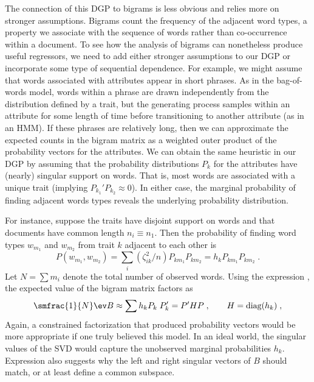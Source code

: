 \documentclass[12pt]{article}
\begin{document}
The connection of this DGP to bigrams is less obvious and relies more on stronger assumptions.  Bigrams count the frequency of the adjacent word types, a property we associate with the sequence of words rather than co-occurrence within a document.  To see how the analysis of bigrams can nonetheless produce useful regressors, we need to add either stronger assumptions to our DGP or incorporate some type of sequential dependence.  For example, we might assume that words associated with attributes appear in short phrases.   As in the bag-of-words model, words within a phrase are drawn independently from the distribution defined by a trait, but the generating process samples within an attribute for some length of time before transitioning to another attribute (as in an HMM).  If these phrases are relatively long, then we can approximate the expected counts in the bigram matrix as a weighted outer product of the probability vectors for the attributes.  We can obtain the same heuristic in our DGP by assuming that the probability distributions $P_k$ for the attributes  have (nearly) singular support on words.  That is, most words are associated with a unique trait (implying $P_{k_1}'P_{k_2}  \approx 0$).  In either case, the marginal probability of finding adjacent words types reveals the underlying probability distribution.  


For instance, suppose the traits have disjoint support on words and that documents have common length $n_i \equiv n_1$. Then the probability of finding  word types  $w_{m_1}$ and $w_{m_2}$ from trait $k$ adjacent to each other is 
 \begin{equation}
  P(w_{m_1},w_{m_2}) = \sum_i \left(\zeta_{ik}^2/n \right) P_{km_1} P_{km_2} 
                                     = h_k P_{km_1} P_{km_2}  \;.
  \label{eq:joint}
\end{equation}
Let $N = \sum m_i$ denote the total number of observed words. Using the expression , the expected value of the bigram matrix factors as
 \begin{equation}
    \smfrac{1}{N} \ev B \approx \sum h_k P_k\; P_k' = P' H P \;, 
                     \qquad  H = \mbox{diag}(h_k)\;,
 \label{eq:B2}
 \end{equation}
Again, a constrained factorization that produced probability vectors would be more appropriate if one truly believed this model.  In an ideal world, the singular values of the SVD would capture the unobserved marginal probabilities  $h_k$.  Expression  also suggests why the left and right singular vectors of $B$ should match, or at least define a common subspace.
\end{document}
